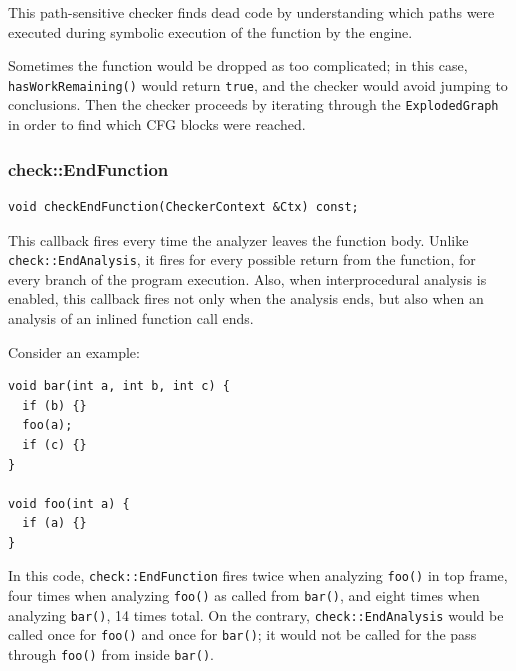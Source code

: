 \documentclass[a4paper,12pt]{article}
\newenvironment{nobr}{\begin{minipage}{\textwidth}\setlength\parskip{1em}
}{\end{minipage}\ignorespacesafterend}
\begin{document}
This path-sensitive checker finds dead code by understanding which paths were executed during symbolic execution of the function by the engine.

Sometimes the function would be dropped as too complicated; in this case, \lstinline|hasWorkRemaining()| would return \lstinline|true|, and the checker would avoid jumping to conclusions. Then the checker proceeds by iterating through the \lstinline|ExplodedGraph| in order to find which CFG blocks were reached.

\begin{nobr}
\subsubsection{check::EndFunction}

\begin{lstlisting}[style=cplusplus,numbers=none]
void checkEndFunction(CheckerContext &Ctx) const;
\end{lstlisting}

This callback fires every time the analyzer leaves the function body. Unlike \lstinline|check::EndAnalysis|, it fires for every possible return from the function, for every branch of the program execution. Also, when interprocedural analysis is enabled, this callback fires not only when the analysis ends, but also when an analysis of an inlined function call ends. 
\end{nobr}

\begin{nobr}
Consider an example:

\begin{lstlisting}[style=cplusplus]
void bar(int a, int b, int c) {
  if (b) {}
  foo(a);
  if (c) {}
}

void foo(int a) {
  if (a) {}
}
\end{lstlisting}
\end{nobr}

In this code, \lstinline|check::EndFunction| fires twice when analyzing \lstinline|foo()| in top frame, four times when analyzing \lstinline|foo()| as called from \lstinline|bar()|, and eight times when analyzing \lstinline|bar()|, 14 times total. On the contrary, \lstinline|check::EndAnalysis| would be called once for \lstinline|foo()| and once for \lstinline|bar()|; it would not be called for the pass through \lstinline|foo()| from inside \lstinline|bar()|.
\end{document}
